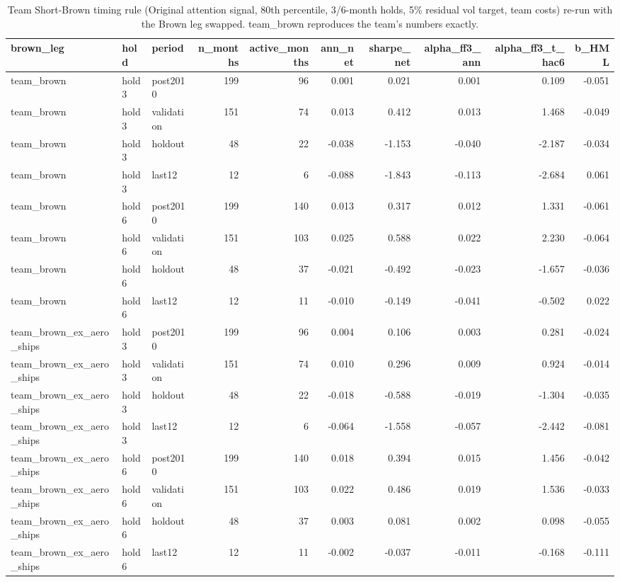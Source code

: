 \begin{table}
\caption{Team Short-Brown timing rule (Original attention signal, 80th percentile, 3/6-month holds, 5\% residual vol target, team costs) re-run with the Brown leg swapped. team\_brown reproduces the team's numbers exactly.}
\label{tab:m4_team_rule}
\begin{tabular}{lllrrrrrrr}
\toprule
brown\_leg & hold & period & n\_months & active\_months & ann\_net & sharpe\_net & alpha\_ff3\_ann & alpha\_ff3\_t\_hac6 & b\_HML \\
\midrule
team\_brown & hold3 & post2010 & 199 & 96 & 0.001 & 0.021 & 0.001 & 0.109 & -0.051 \\
team\_brown & hold3 & validation & 151 & 74 & 0.013 & 0.412 & 0.013 & 1.468 & -0.049 \\
team\_brown & hold3 & holdout & 48 & 22 & -0.038 & -1.153 & -0.040 & -2.187 & -0.034 \\
team\_brown & hold3 & last12 & 12 & 6 & -0.088 & -1.843 & -0.113 & -2.684 & 0.061 \\
team\_brown & hold6 & post2010 & 199 & 140 & 0.013 & 0.317 & 0.012 & 1.331 & -0.061 \\
team\_brown & hold6 & validation & 151 & 103 & 0.025 & 0.588 & 0.022 & 2.230 & -0.064 \\
team\_brown & hold6 & holdout & 48 & 37 & -0.021 & -0.492 & -0.023 & -1.657 & -0.036 \\
team\_brown & hold6 & last12 & 12 & 11 & -0.010 & -0.149 & -0.041 & -0.502 & 0.022 \\
team\_brown\_ex\_aero\_ships & hold3 & post2010 & 199 & 96 & 0.004 & 0.106 & 0.003 & 0.281 & -0.024 \\
team\_brown\_ex\_aero\_ships & hold3 & validation & 151 & 74 & 0.010 & 0.296 & 0.009 & 0.924 & -0.014 \\
team\_brown\_ex\_aero\_ships & hold3 & holdout & 48 & 22 & -0.018 & -0.588 & -0.019 & -1.304 & -0.035 \\
team\_brown\_ex\_aero\_ships & hold3 & last12 & 12 & 6 & -0.064 & -1.558 & -0.057 & -2.442 & -0.081 \\
team\_brown\_ex\_aero\_ships & hold6 & post2010 & 199 & 140 & 0.018 & 0.394 & 0.015 & 1.456 & -0.042 \\
team\_brown\_ex\_aero\_ships & hold6 & validation & 151 & 103 & 0.022 & 0.486 & 0.019 & 1.536 & -0.033 \\
team\_brown\_ex\_aero\_ships & hold6 & holdout & 48 & 37 & 0.003 & 0.081 & 0.002 & 0.098 & -0.055 \\
team\_brown\_ex\_aero\_ships & hold6 & last12 & 12 & 11 & -0.002 & -0.037 & -0.011 & -0.168 & -0.111 \\

\end{tabular}
\end{table}
